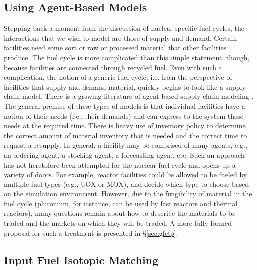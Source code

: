 \subsection{Using Agent-Based Models}

Stepping back a moment from the discussion of nuclear-specific fuel cycles, the
interactions that we wish to model are those of supply and demand. Certain
facilities need some sort or raw or processed material that other facilities
produce. The fuel cycle is more complicated than this simple statement, though,
because facilities are connected through recycled fuel. Even with such a
complication, the notion of a generic fuel cycle, i.e. from the perspective of
facilities that supply and demand material, quickly begins to look like a supply
chain model. There is a growing literature of agent-based supply chain modeling
\cite{swaminathan_modeling_1998,julka_agent-based_2002,van_der_zee_modeling_2005,chatfield_multi-formalism_2007,holmgren_agent_2007}.
The general premise of these types of models is that individual facilities have
a notion of their needs (i.e., their demands) and can express to the system
these needs at the required time. There is heavy use of inventory policy to
determine the correct amount of material inventory that is needed and the
correct time to request a resupply. In general, a facility may be comprised of
many agents, e.g., an ordering agent, a stocking agent, a forecasting agent,
etc. Such an approach has not heretofore been attempted for the nuclear fuel
cycle and opens up a variety of doors. For example, reactor facilities could be
allowed to be fueled by multiple fuel types (e.g., UOX or MOX), and decide which
type to choose based on the simulation environment. However, due to the
fungibility of material in the fuel cycle (plutonium, for instance, can be used
by fast reactors and thermal reactors), many questions remain about how to
describe the materials to be traded and the markets on which they will be
traded. A more fully formed proposal for such a treatment is presented in
\S\ref{sec:gfctp}.

\subsection{Input Fuel Isotopic Matching}

